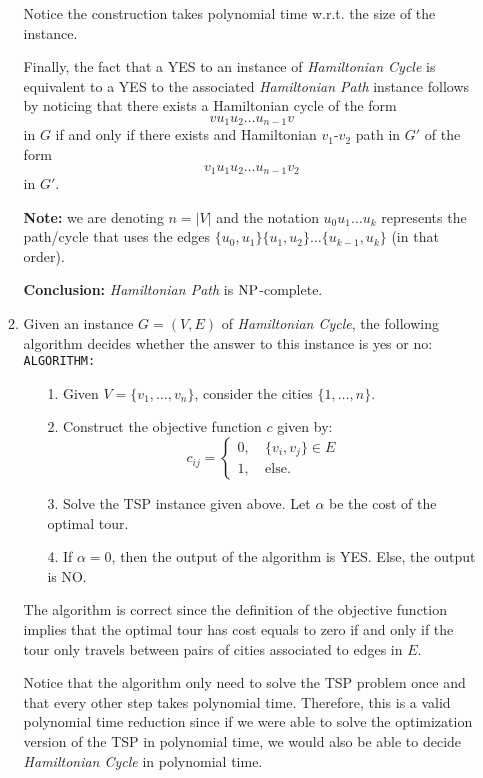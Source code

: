 \begin{enumerate}
\begin{enumerate}
	Notice the construction takes polynomial time w.r.t. the size of the instance.
	
	Finally, the fact that a YES to an instance of {\em Hamiltonian Cycle} is equivalent to a YES to the associated {\em Hamiltonian Path} instance follows by noticing that there exists a Hamiltonian cycle of the form
	$$vu_1u_2\dots u_{n-1}v$$
	in $G$ if and only if there exists and Hamiltonian $v_1$-$v_2$ path in $G'$ of the form
	$$v_1u_1u_2\dots u_{n-1}v_2$$	
	in $G'$.
	
	{\bf Note:} we are denoting $n=|V|$ and the notation $u_0u_1\dots u_k$ represents the path/cycle that uses the edges $\{u_0,u_1\}\{u_1,u_2\}\dots \{u_{k-1},u_k\}$ (in that order).
	
{\bf Conclusion:}	{\em Hamiltonian Path} is $\mbox{NP}$-complete.
	
	\item 	Given an instance $G=(V,E)$ of {\em Hamiltonian Cycle}, the following algorithm decides whether the answer to this instance is yes or no:\\
	
	{\tt ALGORITHM:}
	\begin{itemize}
	  \item[1.] Given $V=\{v_1,\dots,v_n\}$, consider the cities $\{1,\dots,n\}$.
		\item[2.] Construct the objective function $c$ given by:
		$$c_{ij}=\begin{cases}0,\ & \{v_i,v_j\}\in E\\ 1,\ & \text{else.}\end{cases}$$
		\item[3.] Solve the TSP instance given above. Let $\alpha$ be the cost of the optimal tour.
		\item[4.] If $\alpha=0$, then the output of the algorithm is YES. Else, the output is NO.
	\end{itemize}
	
	The algorithm is correct since the definition of the objective function implies that the optimal tour has cost equals to zero if and only if the tour only travels between pairs of cities associated to edges in $E$. 
	
	Notice that the algorithm only need to solve the TSP problem once and that every other step takes polynomial time. Therefore, this is a valid polynomial time reduction since if we were able to solve the  optimization version of the TSP in polynomial time, we would also be able to decide {\em Hamiltonian Cycle} in polynomial time.


\end{enumerate}
\end{enumerate}

